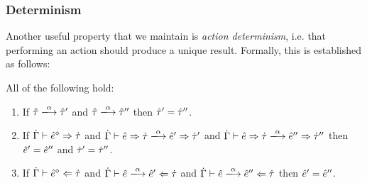 \subsubsection{Determinism}
Another useful property that we maintain is \emph{action determinism}, i.e. that performing an action should produce a unique result. Formally, this is established as follows:
\begin{theorem} All of the following hold:
\label{thrm:actdet}
\begin{enumerate}[itemsep=0px,partopsep=0px,topsep=0px]
\item If $\performTyp{\ztau}{\alpha}{\ztau'}$ and $\performTyp{\ztau}{\alpha}{\ztau''}$ then $\hat{\tau}'=\hat{\tau}''$.
\item If $\dot{\Gamma} \vdash \hat{e}^{\diamond} \Rightarrow \dot{\tau}$ and
  $\performSyn{\hGamma}{\zexp}{\htau}{\alpha}{\zexp'}{\htau'}$ and
  $\performSyn{\hGamma}{\zexp}{\htau}{\alpha}{\zexp''}{\htau''}$ then
  $\hat{e}' = \hat{e}''$ and $\dot{\tau}' = \dot{\tau}''$.

\item If $\dot{\Gamma} \vdash \hat{e}^{\diamond} \Leftarrow \dot{\tau}$ and
  $\performAna{\hGamma}{\zexp}{\htau}{\alpha}{\zexp'}$ and
  $\performAna{\hGamma}{\zexp}{\htau}{\alpha}{\zexp''}$ then $\hat{e}' =
  \hat{e}''$.
\end{enumerate}
\end{theorem}

